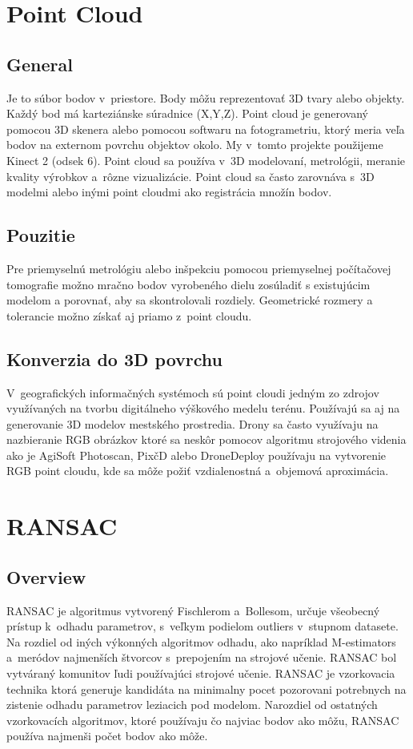 \section{Point Cloud}
\subsection{General}
Je to súbor bodov v priestore. Body môžu reprezentovať 3D tvary alebo objekty. Každý bod má karteziánske súradnice (X,Y,Z). Point cloud je generovaný pomocou 3D skenera alebo pomocou softwaru na fotogrametriu, ktorý meria veľa bodov na externom povrchu objektov okolo. My v tomto projekte použijeme Kinect 2 (odsek 6). Point cloud sa používa v 3D modelovaní, metrológii, meranie kvality výrobkov a rôzne vizualizácie. Point cloud sa často zarovnáva s 3D modelmi alebo inými point cloudmi ako registrácia množín bodov.
\subsection{Pouzitie}
Pre priemyselnú metrológiu alebo inšpekciu pomocou priemyselnej počítačovej tomografie možno mračno bodov vyrobeného dielu zosúladiť s existujúcim modelom a porovnať, aby sa skontrolovali rozdiely. Geometrické rozmery a tolerancie možno získať aj priamo z point cloudu.
\subsection{Konverzia do 3D povrchu}
V geografických informačných systémoch sú point cloudi jedným zo zdrojov využívaných na tvorbu digitálneho výškového medelu terénu. Používajú sa aj na generovanie 3D modelov mestského prostredia. Drony sa často využívaju na nazbieranie RGB obrázkov ktoré sa neskôr pomocov algoritmu strojového videnia ako je AgiSoft Photoscan, PixčD alebo DroneDeploy používaju na vytvorenie RGB point cloudu, kde sa môže požiť vzdialenostná a objemová aproximácia.
\section{RANSAC}
\subsection{Overview}
RANSAC je algoritmus vytvorený Fischlerom a Bollesom, určuje všeobecný prístup k odhadu parametrov, s veľkym podielom outliers v stupnom datasete. Na rozdiel od iných výkonných algoritmov odhadu, ako napríklad M-estimators a meródov najmenších štvorcov s prepojením na strojové učenie. RANSAC bol vytváraný komunitov ľudi používajúci strojové učenie. RANSAC je vzorkovacia technika ktorá generuje kandidáta na minimalny pocet pozorovani potrebnych na zistenie odhadu parametrov leziacich pod modelom. Narozdiel od ostatných vzorkovacích algoritmov, ktoré používaju čo najviac bodov ako môžu, RANSAC používa najmenši počet bodov ako môže.
